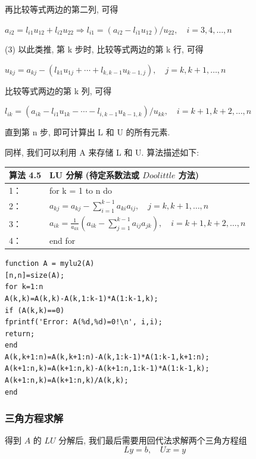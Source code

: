 \documentclass[12pt,a4paper]{article}
\begin{document}
再比较等式两边的第二列, 可得

$a_{i 2}=l_{i 1} u_{12}+l_{i 2} u_{22} \Rightarrow l_{i 1}=\left(a_{i 2}-l_{i 1} u_{12}\right) / u_{22}, \quad i=3,4, \ldots, n$

\noindent(3) 以此类推, 第 k 步时, 比较等式两边的第 k 行, 可得

$u_{k j}=a_{k j}-\left(l_{k 1} u_{1 j}+\cdots+l_{k, k-1} u_{k-1, j}\right), \quad j=k, k+1, \ldots, n$

比较等式两边的第 k 列, 可得

$l_{i k}=\left(a_{i k}-l_{i 1} u_{1 k}-\cdots-l_{i, k-1} u_{k-1, k}\right) / u_{k k}, \quad i=k+1, k+2, \ldots, n$

直到第 n 步, 即可计算出 L 和 U 的所有元素.

同样, 我们可以利用 A 来存储 L 和 U. 算法描述如下:
\begin{table}  
	\begin{tabular*}{16cm}{ll}  
		\hline  
		算法 4.5 &LU 分解 (待定系数法或 $Doolittle$ 方法)\\  
		\hline  
		1：   & for k = 1 to n do\\  
		2：   & \qquad $a_{k j}=a_{k j}-\sum_{i=1}^{k-1} a_{k i} a_{i j}, \quad j=k, k+1, \ldots, n$\\
		3：   & \qquad $a_{i k}=\frac{1}{a_{k k}}\left(a_{i k}-\sum_{j=1}^{k-1} a_{i j} a_{j k}\right), \quad i=k+1, k+2, \ldots, n$\\
		4：   & end for\\
		\hline  
	\end{tabular*}  
\end{table} 

\begin{lstlisting}[language={[ANSI]C}] 
% Matlab code 2 : 待定系数法 LU 分解
function A = mylu2(A)
[n,n]=size(A);
for k=1:n
A(k,k)=A(k,k)-A(k,1:k-1)*A(1:k-1,k);
if (A(k,k)==0)
fprintf('Error: A(%d,%d)=0!\n', i,i);
return;
end
A(k,k+1:n)=A(k,k+1:n)-A(k,1:k-1)*A(1:k-1,k+1:n);
A(k+1:n,k)=A(k+1:n,k)-A(k+1:n,1:k-1)*A(1:k-1,k);
A(k+1:n,k)=A(k+1:n,k)/A(k,k);
end
\end{lstlisting}

\subsubsection{三角方程求解}
得到 $A$ 的 $LU$ 分解后, 我们最后需要用回代法求解两个三角方程组
$$L y=b, \quad U x=y$$
\end{document}
